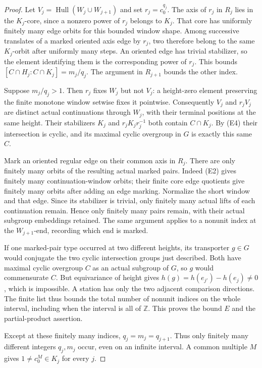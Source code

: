 \begin{proof}
Let \(V_j=\operatorname{Hull}(W_j\cup W_{j+1})\) and set
\(r_j=c_0^{q_j}\). The axis of \(r_j\) in \(R_j\) lies in the
\(K_j\)-core, since a nonzero power of \(r_j\) belongs to \(K_j\).
That core has uniformly finitely many edge orbits for this bounded
window shape. Among successive translates of a marked oriented
axis edge by \(r_j\), two therefore belong to the same \(K_j\)-orbit
after uniformly many steps. An oriented edge has trivial stabilizer,
so the element identifying them is the corresponding power of
\(r_j\). This bounds \([C\cap H_j:C\cap K_j]=m_j/q_j\).
The argument in \(R_{j+1}\) bounds the other index.

Suppose \(m_j/q_j>1\). Then \(r_j\) fixes \(W_j\) but not
\(V_j\): a height-zero element preserving the finite monotone
window setwise fixes it pointwise. Consequently \(V_j\) and
\(r_jV_j\) are distinct actual continuations through \(W_j\),
with their terminal positions at the same height. Their stabilizers
\(K_j\) and \(r_jK_jr_j^{-1}\) both contain \(C\cap K_j\).
By (E4) their intersection is cyclic, and its maximal cyclic
overgroup in \(G\) is exactly this same \(C\).

Mark an oriented regular edge on their common axis in \(R_j\).
There are only finitely many orbits of the resulting actual marked
pairs. Indeed (E2) gives finitely many continuation-window orbits;
their finite core edge quotients give finitely many orbits after
adding an edge marking. Normalize the short window and that edge.
Since its stabilizer is trivial, only finitely many actual lifts of
each continuation remain. Hence only finitely many pairs remain,
with their actual subgroup embeddings retained. The same argument
applies to a nonunit index at the \(W_{j+1}\)-end, recording which
end is marked.

If one marked-pair type occurred at two different heights, its
transporter \(g\in G\) would conjugate the two cyclic intersection
groups just described. Both have maximal cyclic overgroup \(C\)
as an actual subgroup of \(G\), so \(g\) would commensurate \(C\).
But equivariance of height gives
\(h(g)=h(e_{j'})-h(e_j)\ne0\), which is impossible. A station has
only the two adjacent comparison directions. The finite list thus
bounds the total number of nonunit indices on the whole interval,
including when the interval is all of \(\mathbb Z\). This proves
the bound \(E\) and the partial-product assertion.

Except at these finitely many indices,
\(q_j=m_j=q_{j+1}\). Thus only finitely many different integers
\(q_j,m_j\) occur, even on an infinite interval. A common multiple
\(M\) gives \(1\ne c_0^M\in K_j\) for every \(j\).
\end{proof}

